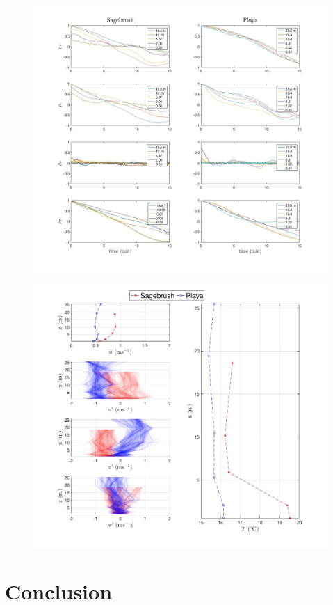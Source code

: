 \documentclass[]{article}
\begin{document}
\begin{figure}
	\centering
	\includegraphics[width=\textwidth]{auto_corr_fig}
	\caption{}
	\label{fig:autocorr}
\end{figure}

\begin{figure}
	\centering
	\includegraphics[width=\textwidth]{u_T}
	\caption{}
	\label{fig:u_T}
\end{figure}


\section{Conclusion}
\end{document}
